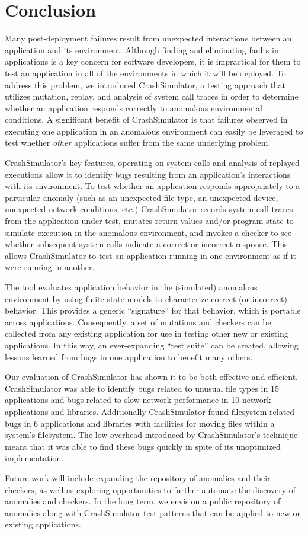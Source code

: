 \section{Conclusion}
\label{SEC:conclusion}

Many post-deployment failures result from unexpected interactions between
an application and its environment.  Although finding and eliminating
faults in applications is a key concern for software developers, it is
impractical for them to test an application in all of the environments in
which it will be deployed.  To address this problem, we introduced
CrashSimulator, a testing approach that utilizes mutation, replay, and
analysis of system call traces in order to determine whether an application
responds correctly to anomalous environmental conditions.  A significant
benefit of CrashSimulator is that failures observed in executing one
application in an anomalous environment can easily be leveraged to test
whether {\em other} applications suffer from the same underlying problem.

CrashSimulator's key features, operating on system calls and analysis of
replayed executions allow it to identify bugs resulting from an
application's interactions with its environment.  To test whether an
application responds appropriately to a particular anomaly (such as an
unexpected file type, an unexpected device, unexpected network conditions,
etc.) CrashSimulator records system call traces from the application under
test, mutates return values and/or program state to simulate execution in
the anomalous environment, and invokes a checker to see whether subsequent
system calls indicate a correct or incorrect response.  This allows
CrashSimulator to test an application running in one environment as if it
were running in another.

The tool evaluates application behavior in the (simulated) anomalous
environment by using finite state models to characterize correct (or
incorrect) behavior.  This provides a generic ``signature'' for that
behavior, which is portable across applications.  Consequently, a set of
mutations and checkers can be collected from any existing application for
use in testing other new or existing applications.  In this way, an
ever-expanding ``test suite'' can be created, allowing lessons learned from
bugs in one application to benefit many others.

Our evaluation of CrashSimulator has shown it to be both effective and
efficient.  CrashSimulator was able to identify bugs related to unusual
file types in 15 applications and bugs related to slow network performance
in 10 network applications and libraries.  Additionally CrashSimulator
found filesystem related bugs in 6 applications and libraries with
facilities for moving files within a system's filesystem.  The low overhead
introduced by CrashSimulator's technique meant that it was able to find
these bugs quickly in spite of its unoptimized implementation.

Future work will include expanding the repository of anomalies and their
checkers, as well as exploring opportunities to further automate the
discovery of anomalies and checkers.  In the long term, we envision a
public repository of anomalies along with CrashSimulator test patterns that
can be applied to new or existing applications.
